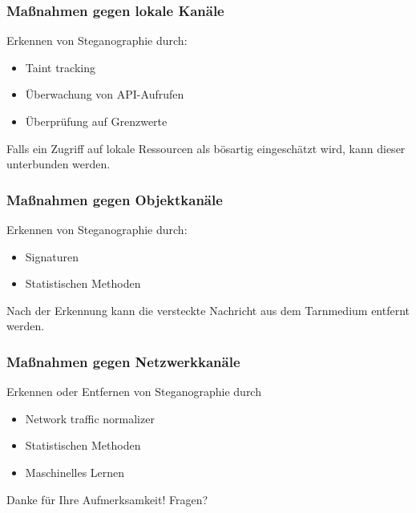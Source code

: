 \documentclass{beamer}
\begin{document}
\begin{frame}
  \frametitle{Maßnahmen gegen lokale Kanäle}
  Erkennen von Steganographie durch:
  \begin{itemize}
    \item Taint tracking
    \item Überwachung von API-Aufrufen
    \item Überprüfung auf Grenzwerte
  \end{itemize}
  Falls ein Zugriff auf lokale Ressourcen als bösartig eingeschätzt wird, kann dieser unterbunden werden.
\end{frame}

\begin{frame}
  \frametitle{Maßnahmen gegen Objektkanäle}
  Erkennen von Steganographie durch:
  \begin{itemize}
    \item Signaturen
    \item Statistischen Methoden
  \end{itemize}
  Nach der Erkennung kann die versteckte Nachricht aus dem Tarnmedium entfernt werden.
\end{frame}

\begin{frame}
  \frametitle{Maßnahmen gegen Netzwerkkanäle}
  Erkennen oder Entfernen von Steganographie durch
  \begin{itemize}
    \item Network traffic normalizer
    \item Statistischen Methoden
    \item Maschinelles Lernen
  \end{itemize}
\end{frame}

%    
  
\begin{frame}
	\centering Danke für Ihre Aufmerksamkeit!
	\centering Fragen?
\end{frame}
\end{document}
